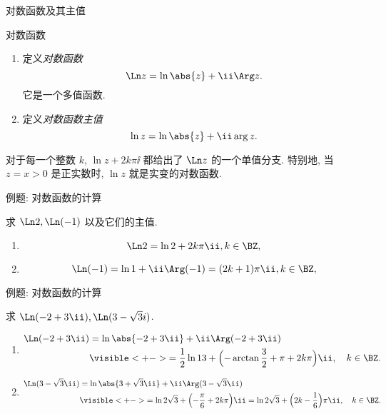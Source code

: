 \begin{frame}{对数函数及其主值}
	\onslide<+->
	\begin{definition*}{对数函数}
		\begin{enumerate}
			\item 定义\emph{对数函数}
			\[
				\Ln z=\ln\abs{z}+\ii\Arg z.
			\]
			它是一个多值函数.
			\item 定义\emph{对数函数主值}
			\[
				\ln z=\ln\abs{z}+\ii\arg z.
			\]
			\bigdel
		\end{enumerate}
	\end{definition*}

	\onslide<+->
	对于每一个整数 $k$, $\ln z+2k\pi\ii$ 都给出了 $\Ln z$ 的一个单值分支.
	\onslide<+->
	特别地, 当 $z=x>0$ 是正实数时, $\ln z$ 就是实变的对数函数.
\end{frame}


\begin{frame}{例题: 对数函数的计算}
	\onslide<+->
	\begin{example}
		求 $\Ln 2,\Ln(-1)$ 以及它们的主值.
	\end{example}

	\onslide<+->
	\begin{solution}
		\begin{enumerate}
			\item
			\[
				\Ln2=\ln2+2k\pi\ii, k\in\BZ,
			\]
			\onslide<+->{%
				主值为 $\ln 2$.
			}
			\item
			\[
				\Ln(-1)=\ln1+\ii\Arg(-1)=(2k+1)\pi\ii, k\in\BZ,
			\]
			\onslide<+->{%
				主值为 $\pi\ii$.
			}
		\end{enumerate}
	\end{solution}
\end{frame}


\begin{frame}{例题: 对数函数的计算}
	\beqskip{5pt}
	\onslide<+->
	\begin{example}
	求 $\Ln(-2+3\ii),\Ln(3-\sqrt3 i)$.
	\end{example}

	\onslide<+->
	\begin{solution}
		\begin{enumerate}
			\item
			\begin{align*}
				\Ln(-2+3\ii)&=\ln\abs{-2+3\ii}+\ii\Arg(-2+3\ii)\\
				&\visible<+->{=\frac 12\ln 13+\Bigl(-\arctan\frac 32+\pi+2k\pi\Bigr)\ii,\quad k\in\BZ.}
			\end{align*}
			\item
			\begin{align*}
				\Ln(3-\sqrt3\ii)&=\ln\abs{3+\sqrt 3\ii}+\ii\Arg(3-\sqrt 3\ii)\\
				&\visible<+->{=\ln 2\sqrt 3+\Bigl(-\frac\pi6+2k\pi\Bigr)\ii
				=\ln 2\sqrt 3+\Bigl(2k-\frac16\Bigr)\pi\ii,\quad k\in\BZ.}
			\end{align*}
		\end{enumerate}
		\vspace{-.5\baselineskip}
	\end{solution}
	\endgroup
\end{frame}


